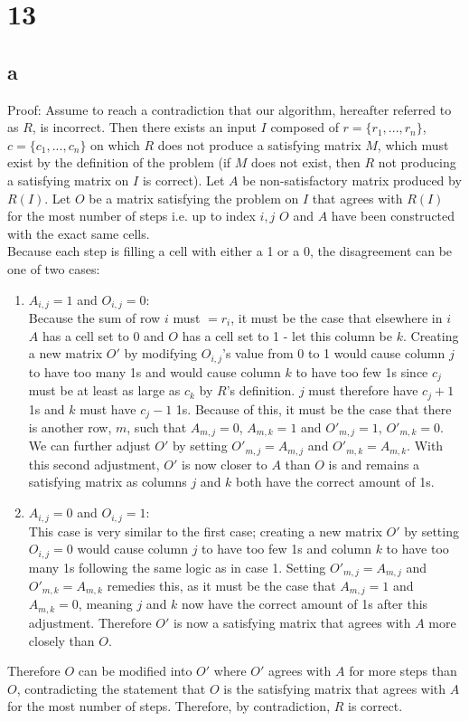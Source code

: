 \documentclass[letterpaper,notitlepage,twoside]{article}
\begin{document}
\section*{13}
\subsection*{a}
Proof: Assume to reach a contradiction that our algorithm, hereafter referred to as $R$, is incorrect. Then there exists an input $I$ composed of $r = \{r_1,...,r_n\}$, $c = \{c_1,...,c_n\}$  on which $R$ does not produce a satisfying matrix $M$, which must exist by the definition of the problem (if $M$ does not exist, then $R$ not producing a satisfying matrix on $I$ is correct). Let $A$ be non-satisfactory matrix produced by $R(I)$. Let $O$ be a matrix satisfying the problem on $I$ that agrees with $R(I)$ for the most number of steps i.e. up to index $i,j$ $O$ and $A$ have been constructed with the exact same cells. \\
Because each step is filling a cell with either a 1 or a 0, the disagreement can be one of two cases:
\begin{enumerate}
  \item $A_{i,j} = 1$ and $O_{i,j} =0$: \\
  Because the sum of row $i$ must $= r_i$, it must be the case that elsewhere in $i$ $A$ has a cell set to 0 and $O$ has a cell set to 1 - let this column be $k$. Creating a new matrix $O'$ by modifying $O_{i,j}$'s value from 0 to 1 would cause column $j$ to have too many 1s and would cause column $k$ to have too few 1s since $c_j$ must be at least as large as $c_k$ by $R$'s definition. $j$ must therefore have $c_j+1$ 1s and $k$ must have $c_j-1$ 1s. Because of this, it must be the case that there is another row, $m$, such that $A_{m,j} = 0$, $A_{m,k} = 1$ and $O'_{m,j} = 1$, $O'_{m,k} = 0$. We can further adjust $O'$ by setting $O'_{m,j} = A_{m,j}$ and $O'_{m,k} = A_{m,k}$. With this second adjustment, $O'$ is now closer to $A$ than $O$ is and remains a satisfying matrix as columns $j$ and $k$ both have the correct amount of 1s. \\
  \item $A_{i,j} = 0$ and $O_{i,j} =1$: \\
  This case is very similar to the first case; creating a new matrix $O'$ by setting $O_{i,j} = 0$ would cause column $j$ to have too few 1s and column $k$ to have too many 1s following the same logic as in case 1. Setting $O'_{m,j} = A_{m,j}$ and $O'_{m,k} = A_{m,k}$ remedies this, as it must be the case that $A_{m,j} = 1$ and $A_{m,k} = 0$, meaning $j$ and $k$ now have the correct amount of 1s after this adjustment. Therefore $O'$ is now a satisfying matrix that agrees with $A$ more closely than $O$. \\
\end{enumerate}
Therefore $O$ can be modified into $O'$ where $O'$ agrees with $A$ for more steps than $O$, contradicting the statement that $O$ is the satisfying matrix that agrees with $A$ for the most number of steps.
Therefore, by contradiction, $R$ is correct. 
\end{document}

